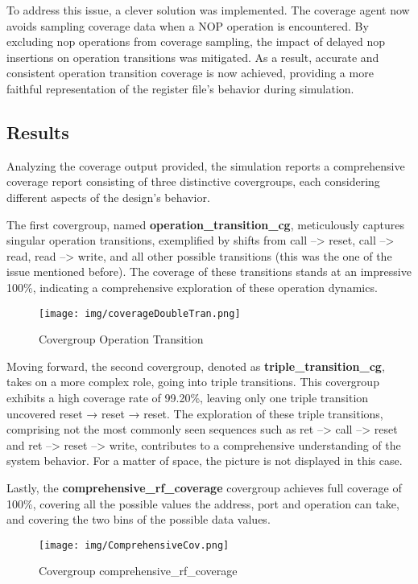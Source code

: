 \documentclass[12pt,a4paper]{report}
\begin{document}
To address this issue, a clever solution was implemented. The coverage agent now avoids sampling coverage data when a NOP operation is encountered. By excluding nop operations from coverage sampling, the impact of delayed nop insertions on operation transitions was mitigated. As a result, accurate and consistent operation transition coverage is now achieved, providing a more faithful representation of the register file's behavior during simulation.

\subsection{Results}
Analyzing the coverage output provided, the simulation reports a comprehensive coverage report consisting of three distinctive covergroups, each considering different aspects of the design's behavior.

The first covergroup, named \textbf{operation\_transition\_cg}, meticulously captures singular operation transitions, exemplified by shifts from call --> reset, call --> read, read --> write, and all other possible transitions (this was the one of the issue mentioned before). The coverage of these transitions stands at an impressive 100\%, indicating a comprehensive exploration of these operation dynamics.
\begin{figure}[H]
\centering
\texttt{[image: img/coverageDoubleTran.png]}
\label{Covergroup Operation Transition}
\caption{Covergroup Operation Transition}
\end{figure}
\vspace{0.3cm}
Moving forward, the second covergroup, denoted as \textbf{triple\_transition\_cg}, takes on a more complex role, going into triple transitions. This covergroup exhibits a high coverage rate of 99.20\%, leaving only one triple transition uncovered reset → reset → reset. The exploration of these triple transitions, comprising not the most commonly seen sequences such as ret --> call --> reset and ret --> reset --> write, contributes to a comprehensive understanding of the system behavior. For a matter of space, the picture is not displayed in this case.

Lastly, the \textbf{comprehensive\_rf\_coverage} covergroup achieves full coverage of 100\%, covering all the possible values the address, port and operation can take, and covering the two bins of the possible data values.
\begin{figure}[H]
\centering
\texttt{[image: img/ComprehensiveCov.png]}
\label{Covergroup comprehensive\_rf\_coverage}
\caption{Covergroup comprehensive\_rf\_coverage}
\end{figure}
\end{document}
